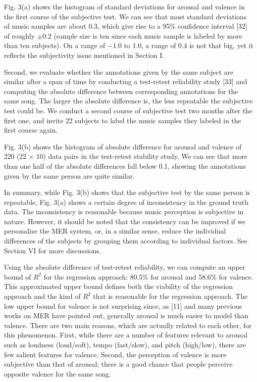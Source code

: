 \documentclass[journal, twoside]{IEEEtran}
\begin{document}
Fig. 3(a) shows the histogram of standard deviations for arousal and valence in the first course of the subjective test. We can see that most standard deviations of music samples are about 0.3, which give rise to a 95\% confidence interval [32] of roughly \(\pm{0.2}\) (sample size is ten since each music sample is labeled by more than ten subjects). On a range of \(-1.0\) to 1.0, a range of 0.4 is not that big, yet it reflects the subjectivity issue
mentioned in Section I.

Second, we evaluate whether the annotations given by the same subject are similar after a span of time by conducting a test-retest reliability study [33] and computing the absolute difference between corresponding annotations for the same song. The larger the absolute difference is, the less repeatable the subjective test could be. We conduct a second course of subjective test two months after the first one, and invite 22 subjects to label the music samples they labeled in the first course again.

Fig. 3(b) shows the histogram of absolute difference for arousal and valence of 220 (22 \(\times\) 10) data pairs in the test-retest stability study. We can see that more than one half of the absolute differences fall below 0.1, showing the annotations given by the same person are quite similar.

In summary, while Fig. 3(b) shows that the subjective test by the same person is repeatable, Fig. 3(a) shows a certain degree of inconsistency in the ground truth data. The inconsistency is reasonable because music perception is subjective in nature. However, it should be noted that the consistency can be improved if we personalize the MER system, or, in a similar sense, reduce the individual differences of the subjects by grouping them according to individual factors. See Section VI for more discussions.

Using the absolute difference of test-retest reliability, we can compute an upper bound of \(R^2\) for the regression approach: 80.5\% for arousal and 58.6\% for valence. This approximated upper bound defines both the viability of the regression approach and the kind of \(R^2\) that is reasonable for the regression approach. The low upper bound for valence is not surprising since, as [11] and many previous works on MER have pointed out, generally arousal is much easier to model than valence. There are two main reasons, which are actually related to each other, for this phenomenon. First, while there are a number of features relevant to arousal such as loudness (loud/soft), tempo (fast/slow), and pitch (high/low), there are few salient features for valence. Second, the perception of valence is more subjective than that of arousal; there is a good chance that people perceive opposite valence for the same song.
\end{document}
